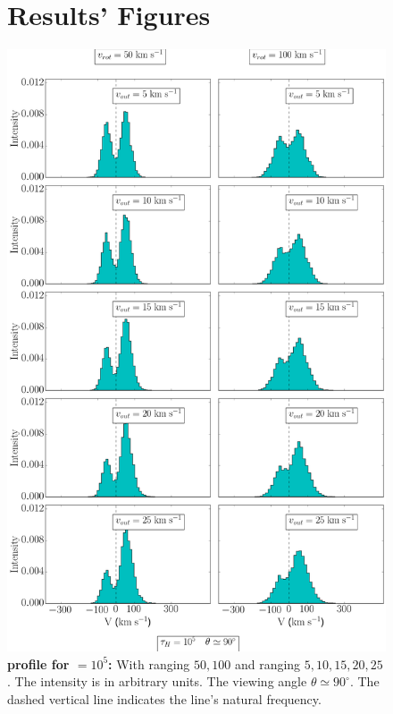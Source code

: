 \documentclass[twocolappendix]{latex/emulateapj}
\begin{document}
\begin{figure}[!htbp]
	\centering
	\begin{minipage}[b]{0.45\textwidth}
		\section{Results' Figures}
		\label{ap:results_figures}
		
		\includegraphics[width=\textwidth]{./figures/3_tau10E5_phi83-90}
		\caption{\textbf{\lya profile for \tauh$=10^5$:} With \vrot ranging $50,100$ \kms and \vout ranging $5,10,15,20,25$ \kms. The intensity is in arbitrary units. The viewing angle $\theta \simeq 90^\circ$. The dashed vertical line indicates the \lya line's natural frequency. 
}
\end{minipage}
\end{figure}
\end{document}
